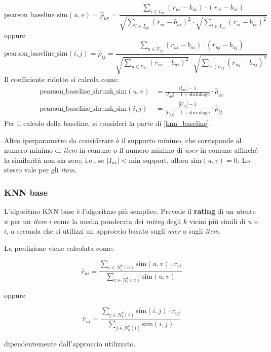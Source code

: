 \begin{itemize}
        \[
        \text{pearson\_baseline\_sim}(u, v) = \hat{\rho}_{uv} = \frac{\sum_{i \in I_{uv}} (r_{ui} - b_{ui}) \cdot (r_{vi} - b_{vi})}{\sqrt{\sum_{i \in I_{uv}} (r_{ui} - b_{ui})^2} \cdot \sqrt{\sum_{i \in I_{uv}} (r_{vi} - b_{vi})^2}}
        \]
        oppure
        \[
        \text{pearson\_baseline\_sim}(i, j) = \hat{\rho}_{ij} = \frac{\sum_{u \in U_{ij}} (r_{ui} - b_{ui}) \cdot (r_{uj} - b_{uj})}{\sqrt{\sum_{u \in U_{ij}} (r_{ui} - b_{ui})^2} \cdot \sqrt{\sum_{u \in U_{ij}} (r_{uj} - b_{uj})^2}}
        \]
        Il coefficiente ridotto si calcola come:
        \begin{align*}
            \text{pearson\_baseline\_shrunk\_sim}(u, v) &= \frac{|I_{uv}| - 1}{|I_{uv}| - 1 + \text{shrinkage}} \cdot \hat{\rho}_{uv} \\
            \text{pearson\_baseline\_shrunk\_sim}(i, j) &= \frac{|U_{ij}| - 1}{|U_{ij}| - 1 + \text{shrinkage}} \cdot \hat{\rho}_{ij}
        \end{align*}
        Per il calcolo della baseline, si consideri la parte di \ref{knn_baseline}.
\end{itemize}

Altro iperparametro da considerare è il supporto minimo, che corrisponde al numero minimo di \emph{item} in comune o il numero minimo di \emph{user} in comune affinché la similarità non sia zero, i.e., se \(|I_{uv}| < \text{min support}\), allora \(\text{sim}(u, v) = 0\). Lo stesso vale per gli \emph{item}.

\subsubsection*{KNN base}

L'algoritmo KNN base è l'algoritmo più semplice. Prevede il \textbf{rating} di un utente \(u\) per un \emph{item} \(i\) come la media ponderata dei \emph{rating} degli \(k\) vicini più simili di \(u\) o \(i\), a seconda che si utilizzi un approccio basato sugli \emph{user} o sugli \emph{item}.

La predizione viene calcolata come:

\[
\hat{r}_{ui} = \frac{\sum_{v \in N^k_i(u)} \text{sim}(u, v) \cdot r_{vi}}{\sum_{v \in N^k_i(u)} \text{sim}(u, v)}
\]

oppure

\[
\hat{r}_{ui} = \frac{\sum_{j \in N^k_u(i)} \text{sim}(i, j) \cdot r_{uj}}{\sum_{j \in N^k_u(i)} \text{sim}(i, j)}
\]

dipendentemente dall'approccio utilizzato.

